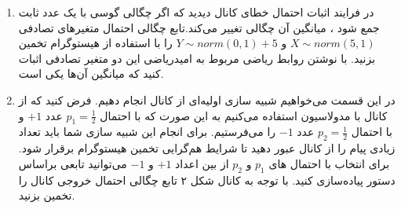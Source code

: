 \documentclass[14pt, professionalfont]{article}
\begin{document}
\begin{enumerate}
		\item 
		در فرایند اثبات احتمال خطای کانال 
		\:
		\:
		دیدید که اگر چگالی گوسی با یک عدد ثابت جمع شود ،‌ میانگین آن چگالی تغییر می‌کند.تابع چگالی احتمال متغیر‌های تصادفی 
		\:
		$X \sim norm(5,1)$
		\:
		و
		\: 
		$Y \sim  norm(0,1) + 5$
		\:
		را با استفاده از هیستوگرام تخمین بزنید. با نوشتن روابط ریاضی مربوط به امید‌ریاضی این دو متغیر تصادفی اثبات کنید که میانگین آن‌ها یکی است.
		
	
	\item 
	در این قسمت می‌خواهیم شبیه سازی اولیه‌ای از کانال 
	\:
	\:
	انجام دهیم. فرض کنید که از کانال با مدولاسیون 
	\:
	\:
	استفاده می‌کنیم به این صورت که با احتمال 
	\:
	$p_1 = \frac{1}{2}$
	\:
	عدد 
	\:
	$+1$
	\:
	و با احتمال 
	\:
	$p_2 = \frac{1}{2}$
	\:
	عدد 
	\:
	$-1$
	\:
	را می‌فرستیم. برای انجام این شبیه سازی شما باید تعداد زیادی پیام را از کانال عبور دهید تا شرایط هم‌گرایی تخمین هیستوگرام برقرار شود. برای انتخاب با احتمال های 
	\:
	$p_1$
	\:
	و 
	\:
	$p_2$
	\:
	از بین اعداد 
	\:
	$+1$
	\:
	و 
	\:
	$-1$
	\:
	می‌توانید تابعی بر‌اساس دستور 
	\:
	\:
	پیاده‌سازی کنید.  با توجه به کانال شکل ۲ تابع چگالی احتمال خروجی کانال را تخمین بزنید.
	

\end{enumerate}
\end{document}
